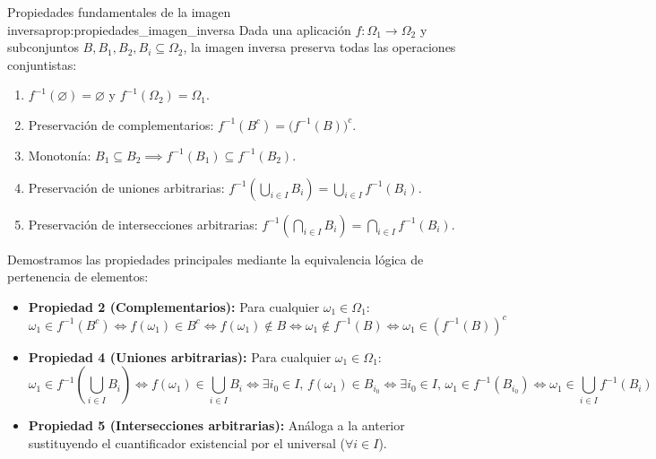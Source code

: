 \begin{proposicion}{Propiedades fundamentales de la imagen inversa}{prop:propiedades_imagen_inversa}
Dada una aplicación $f: \Omega_1 \to \Omega_2$ y subconjuntos $B, B_1, B_2, B_i \subseteq \Omega_2$, la imagen inversa preserva todas las operaciones conjuntistas:
\begin{enumerate}[label=\arabic*)]
    \item $f^{-1}(\varnothing) = \varnothing$ \quad y \quad $f^{-1}(\Omega_2) = \Omega_1$.
    \item Preservación de complementarios: $f^{-1}(B^c) = \bigl(f^{-1}(B)\bigr)^c$.
    \item Monotonía: $B_1 \subseteq B_2 \implies f^{-1}(B_1) \subseteq f^{-1}(B_2)$.
    \item Preservación de uniones arbitrarias: $\displaystyle f^{-1}\left( \bigcup_{i \in I} B_i \right) = \bigcup_{i \in I} f^{-1}(B_i)$.
    \item Preservación de intersecciones arbitrarias: $\displaystyle f^{-1}\left( \bigcap_{i \in I} B_i \right) = \bigcap_{i \in I} f^{-1}(B_i)$.
\end{enumerate}

\tcblower

\begin{demostracion}
Demostramos las propiedades principales mediante la equivalencia lógica de pertenencia de elementos:
\begin{itemize}
    \item \textbf{Propiedad 2 (Complementarios):} Para cualquier $\omega_1 \in \Omega_1$:
    \[
        \omega_1 \in f^{-1}(B^c) \iff f(\omega_1) \in B^c \iff f(\omega_1) \notin B \iff \omega_1 \notin f^{-1}(B) \iff \omega_1 \in (f^{-1}(B))^c
    \]
    \item \textbf{Propiedad 4 (Uniones arbitrarias):} Para cualquier $\omega_1 \in \Omega_1$:
    \[
        \omega_1 \in f^{-1}\left(\bigcup_{i \in I} B_i\right) \iff f(\omega_1) \in \bigcup_{i \in I} B_i \iff \exists i_0 \in I, \, f(\omega_1) \in B_{i_0} \iff \exists i_0 \in I, \, \omega_1 \in f^{-1}(B_{i_0}) \iff \omega_1 \in \bigcup_{i \in I} f^{-1}(B_i)
    \]
    \item \textbf{Propiedad 5 (Intersecciones arbitrarias):} Análoga a la anterior sustituyendo el cuantificador existencial por el universal ($\forall i \in I$).
\end{itemize}
\end{demostracion}
\end{proposicion}

